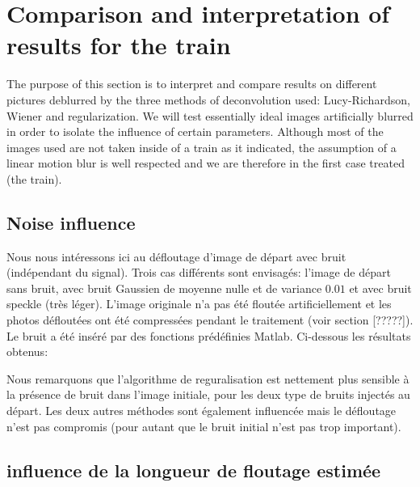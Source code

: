 
\section{Comparison and interpretation of results for the train}

The purpose of this section is to interpret and compare results on different pictures deblurred by the three methods of deconvolution used: Lucy-Richardson, Wiener and regularization. We will test essentially ideal images artificially blurred in order to isolate the influence of certain parameters. Although most of the images used are not taken inside of a train as it indicated, the assumption of a linear motion blur is well respected and we are therefore in the first case treated (the train).

\subsection{Noise influence}

Nous nous intéressons ici au défloutage d'image de départ avec bruit (indépendant du signal). Trois cas différents sont envisagés: l'image de départ sans bruit, avec bruit Gaussien de moyenne nulle et de variance $0.01$ et avec bruit speckle (très léger). L'image originale n'a pas été floutée artificiellement et les photos défloutées ont été compressées pendant le traitement (voir section [?????]). Le bruit a été inséré par des fonctions prédéfinies Matlab. Ci-dessous les résultats obtenus:


Nous remarquons que l'algorithme de reguralisation est nettement plus sensible à la présence de bruit dans l'image initiale, pour les deux type de bruits injectés au départ. Les deux autres méthodes sont également influencée mais le défloutage n'est pas compromis (pour autant que le bruit initial n'est pas trop important).


\subsection{influence de la longueur de floutage estimée}


